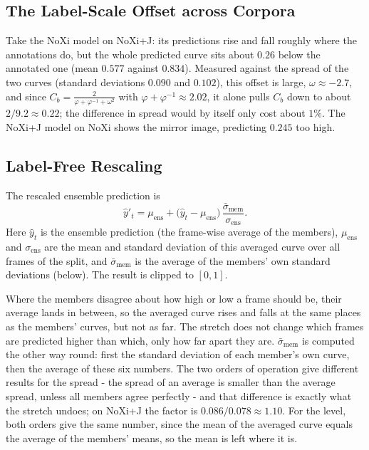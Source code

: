 \documentclass[10pt,a4paper,twocolumn]{article}
\begin{document}
	\subsection*{The Label-Scale Offset across Corpora}
	Take the NoXi model on NoXi+J: its predictions rise and fall roughly where the annotations do, but the whole predicted curve sits about $0.26$ below the annotated one (mean $0.577$ against $0.834$). Measured against the spread of the two curves (standard deviations $0.090$ and $0.102$), this offset is large, $\omega \approx -2.7$, and since $\displaystyle C_b = \frac{2}{\varphi + \varphi^{-1} + \omega^2}$ with $\varphi + \varphi^{-1} \approx 2.02$, it alone pulls $C_b$ down to about $2/9.2 \approx 0.22$; the difference in spread would by itself only cost about $1\%$. The NoXi+J model on NoXi shows the mirror image, predicting $0.245$ too high.

	\subsection*{Label-Free Rescaling}
	The rescaled ensemble prediction is
	$$\hat{y}'_t = \mu_{\text{ens}} + \bigl(\hat{y}_t - \mu_{\text{ens}}\bigr)\,\frac{\bar{\sigma}_{\text{mem}}}{\sigma_{\text{ens}}}.$$
	Here $\hat{y}_t$ is the ensemble prediction (the frame-wise average of the members), $\mu_{\text{ens}}$ and $\sigma_{\text{ens}}$ are the mean and standard deviation of this averaged curve over all frames of the split, and $\bar{\sigma}_{\text{mem}}$ is the average of the members' own standard deviations (below). The result is clipped to $[0,1]$.

	Where the members disagree about how high or low a frame should be, their average lands in between, so the averaged curve rises and falls at the same places as the members' curves, but not as far. The stretch does not change which frames are predicted higher than which, only how far apart they are. $\bar{\sigma}_{\text{mem}}$ is computed the other way round: first the standard deviation of each member's own curve, then the average of these six numbers. The two orders of operation give different results for the spread - the spread of an average is smaller than the average spread, unless all members agree perfectly - and that difference is exactly what the stretch undoes; on NoXi+J the factor is $0.086 / 0.078 \approx 1.10$. For the level, both orders give the same number, since the mean of the averaged curve equals the average of the members' means, so the mean is left where it is.
\end{document}
